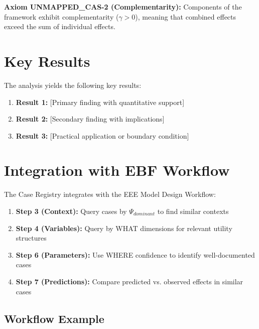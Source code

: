 \begin{tcolorbox}[colback=yellow!5!white,colframe=yellow!75!black,title=Axiom UNMAPPED_CAS-2: Complementarity]
\textbf{Axiom UNMAPPED_CAS-2 (Complementarity):}
Components of the framework exhibit complementarity ($\gamma > 0$), meaning
that combined effects exceed the sum of individual effects.
\end{tcolorbox}



\section{Key Results}
\label{sec:cas-results}

The analysis yields the following key results:

\begin{enumerate}
    \item \textbf{Result 1:} [Primary finding with quantitative support]
    \item \textbf{Result 2:} [Secondary finding with implications]
    \item \textbf{Result 3:} [Practical application or boundary condition]
\end{enumerate}


\section{Integration with EBF Workflow}

The Case Registry integrates with the EEE Model Design Workflow:

\begin{enumerate}
    \item \textbf{Step 3 (Context):} Query cases by $\Psi_{dominant}$ to find similar contexts
    \item \textbf{Step 4 (Variables):} Query by WHAT dimensions for relevant utility structures
    \item \textbf{Step 6 (Parameters):} Use WHERE confidence to identify well-documented cases
    \item \textbf{Step 7 (Predictions):} Compare predicted vs. observed effects in similar cases
\end{enumerate}

\subsection{Workflow Example}

